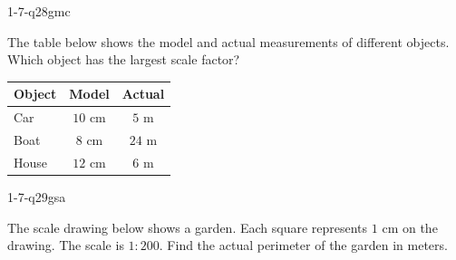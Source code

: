 \begin{practiceQuestion}{1-7-q28}{gmc}
\begin{questionText}
The table below shows the model and actual measurements of different objects. Which object has the largest scale factor?

\begin{center}
\begin{tabular}{|l|c|c|}
\hline
\textbf{Object} & \textbf{Model} & \textbf{Actual} \\
\hline
Car & $10$ cm & $5$ m \\
\hline
Boat & $8$ cm & $24$ m \\
\hline
House & $12$ cm & $6$ m \\
\hline
\end{tabular}
\end{center}
\end{questionText}
\end{practiceQuestion}

\begin{practiceQuestion}{1-7-q29}{gsa}
\begin{questionText}
The scale drawing below shows a garden. Each square represents $1$ cm on the drawing. The scale is $1 : 200$. Find the actual perimeter of the garden in meters.

\begin{center}
\end{center}
\end{questionText}
\end{practiceQuestion}

